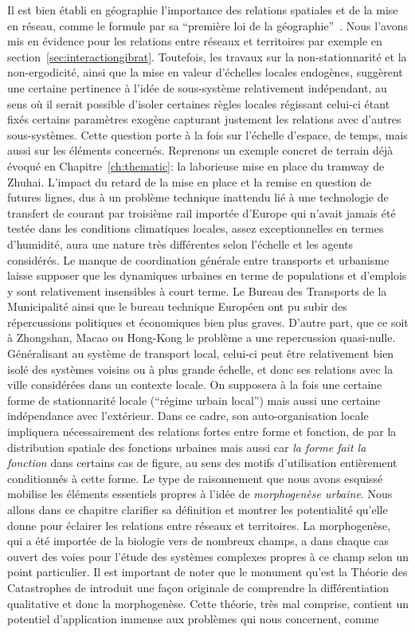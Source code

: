 Il est bien établi en géographie l'importance des relations spatiales et de la mise en réseau, comme le formule  par sa ``première loi de la géographie''~\cite{tobler2004first}. Nous l'avons mis en évidence pour les relations entre réseaux et territoires par exemple en section~\ref{sec:interactiongibrat}. Toutefois, les travaux sur la non-stationnarité et la non-ergodicité, ainsi que la mise en valeur d'échelles locales endogènes, suggèrent une certaine pertinence à l'idée de sous-système relativement indépendant, au sens où il serait possible d'isoler certaines règles locales régissant celui-ci étant fixés certains paramètres exogène capturant justement les relations avec d'autres sous-systèmes. Cette question porte à la fois sur l'échelle d'espace, de temps, mais aussi sur les éléments concernés. Reprenons un exemple concret de terrain déjà évoqué en Chapitre~\ref{ch:thematic}: la laborieuse mise en place du tramway de Zhuhai. L'impact du retard de la mise en place et la remise en question de futures lignes, dus à un problème technique inattendu lié à une technologie de transfert de courant par troisième rail importée d'Europe qui n'avait jamais été testée dans les conditions climatiques locales, assez exceptionnelles en termes d'humidité, aura une nature très différentes selon l'échelle et les agents considérés. Le manque de coordination générale entre transports et urbanisme laisse supposer que les dynamiques urbaines en terme de populations et d'emplois y sont relativement insensibles à court terme. Le Bureau des Transports de la Municipalité ainsi que le bureau technique Européen ont pu subir des répercussions politiques et économiques bien plus graves\comment[FL]{$\sim$}. D'autre part, que ce soit à Zhongshan, Macao ou Hong-Kong le problème a une repercussion quasi-nulle. Généralisant au système de transport local, celui-ci peut être relativement bien isolé des systèmes voisins ou à plus grande échelle, et donc ses relations avec la ville considérées dans un contexte locale. On supposera à la fois une certaine forme de stationnarité locale (``régime urbain local'') mais aussi une certaine indépendance avec l'extérieur. Dans ce cadre, son auto-organisation locale impliquera nécessairement des relations fortes entre forme et fonction, de par la distribution spatiale des fonctions urbaines mais aussi car \emph{la forme fait la fonction} dans certains cas de figure, au sens des motifs d'utilisation entièrement conditionnés à cette forme. Le type de raisonnement que nous avons esquissé mobilise les éléments essentiels propres à l'idée de \emph{morphogenèse urbaine}. Nous allons dans ce chapitre clarifier sa définition et montrer les potentialité qu'elle donne pour éclairer les relations entre réseaux et territoires. La morphogenèse, qui a été importée de la biologie vers de nombreux champs, a dans chaque cas ouvert des voies pour l'étude des systèmes complexes propres à ce champ selon un point particulier. Il est important de noter que le monument qu'est la Théorie des Catastrophes de  introduit une façon originale de comprendre la différentiation qualitative et donc la morphogenèse. Cette théorie, très mal comprise, contient un potentiel d'application immense aux problèmes qui nous concernent, comme 
